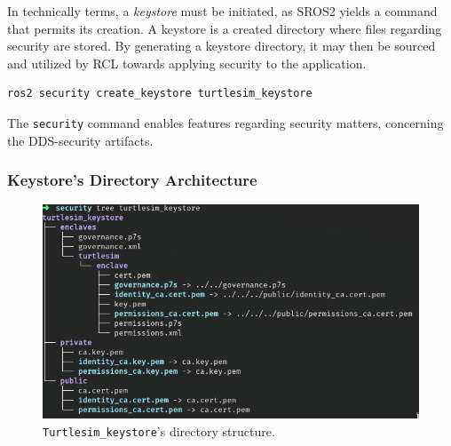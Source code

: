 
In technically terms, a \textit{keystore} must be initiated, as SROS2 yields a command that permits its creation. A keystore is a created directory where files regarding security are stored. By generating a keystore directory, it may then be sourced and utilized by RCL towards applying security to the application.
            
\begin{lstlisting}[title={\textit{Keystore} creation using the proper SROS2 command.}]
ros2 security create_keystore turtlesim_keystore
\end{lstlisting}

The \texttt{security} command enables features regarding security matters, concerning the DDS-security artifacts.

\subsubsection{Keystore's Directory Architecture}

\begin{figure}[H]
    \centering
    \includegraphics[width=0.7\linewidth]{images/ts_keystore_tree.png}
    \caption{\texttt{Turtlesim\_keystore}'s directory structure.}
    \label{fig:ts-keystore}
\end{figure}

